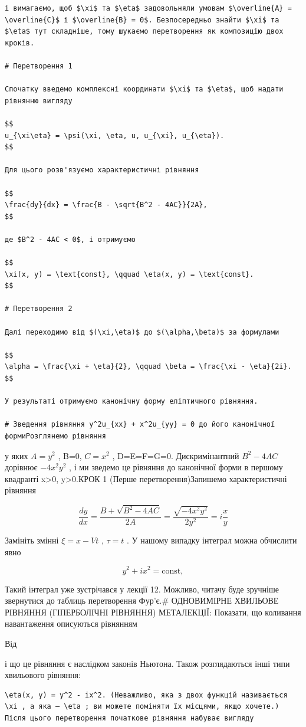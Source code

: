 \documentclass[
  ukrainian,
]{article}
\begin{document}
\begin{verbatim}
і вимагаємо, щоб $\xi$ та $\eta$ задовольняли умовам $\overline{A} = \overline{C}$ і $\overline{B} = 0$. Безпосередньо знайти $\xi$ та $\eta$ тут складніше, тому шукаємо перетворення як композицію двох кроків.

# Перетворення 1

Спочатку введемо комплексні координати $\xi$ та $\eta$, щоб надати рівнянню вигляду

$$
u_{\xi\eta} = \psi(\xi, \eta, u, u_{\xi}, u_{\eta}).
$$

Для цього розв'язуємо характеристичні рівняння

$$
\frac{dy}{dx} = \frac{B - \sqrt{B^2 - 4AC}}{2A},
$$

де $B^2 - 4AC < 0$, і отримуємо

$$
\xi(x, y) = \text{const}, \qquad \eta(x, y) = \text{const}.
$$

# Перетворення 2

Далі переходимо від $(\xi,\eta)$ до $(\alpha,\beta)$ за формулами

$$
\alpha = \frac{\xi + \eta}{2}, \qquad \beta = \frac{\xi - \eta}{2i}.
$$

У результаті отримуємо канонічну форму еліптичного рівняння.

# Зведення рівняння y^2u_{xx} + x^2u_{yy} = 0 до його канонічної формиРозглянемо рівняння
\end{verbatim}

у яких \(A=y^2\) , B=0, \(C=x^2\) , D=E=F=G=0. Дискримінантний
\(B^2-4AC\) дорівнює \(-4x^2y^2\) , і ми зведемо це рівняння до
канонічної форми в першому квадранті x\textgreater0, y\textgreater0.КРОК
1 (Перше перетворення)Запишемо характеристичні рівняння

\[
\frac{dy}{dx} = \frac{B + \sqrt{B^2 - 4AC}}{2A} = \frac{\sqrt{-4x^2y^2}}{2y^2} = i\frac{x}{y}
\]

Замініть змінні \(\xi = x - Vt\) , \(\tau = t\) . У нашому випадку
інтеграл можна обчислити явно

\[
y^2 + ix^2 = \text{const},
\]

Такий інтеграл уже зустрічався у лекції 12. Можливо, читачу буде
зручніше звернутися до таблиць перетворення Фур'є.\# ОДНОВИМІРНЕ
ХВИЛЬОВЕ РІВНЯННЯ (ГІПЕРБОЛІЧНІ РІВНЯННЯ) МЕТАЛЕКЦІЇ: Показати, що
коливання навантаження описуються рівнянням

Від

і що це рівняння є наслідком законів Ньютона. Також розглядаються інші
типи хвильового рівняння:

\begin{verbatim}
\eta(x, y) = y^2 - ix^2. (Неважливо, яка з двох функцій називається \xi , а яка — \eta ; ви можете поміняти їх місцями, якщо хочете.) Після цього перетворення початкове рівняння набуває вигляду
\end{verbatim}
\end{document}
